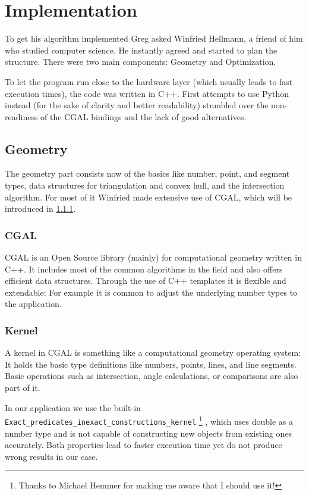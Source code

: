\chapter{Implementation}\label{cha:implementation}
To get his algorithm implemented Greg asked Winfried Hellmann, a
friend of him who studied computer science. He instantly agreed and
started to plan the structure. There were two main components:
Geometry and Optimization.

To let the program run close to the hardware layer (which usually
leads to fast execution times), the code was written in C++. First
attempts to use Python instead (for the sake of clarity and better
readability) stumbled over the non-readiness of the CGAL bindings and
the lack of good alternatives.

\section{Geometry}
The geometry part consists now of the basics like number, point, and
segment types, data structures for triangulation and convex hull, and
the intersection algorithm. For most of it Winfried made extensive use
of CGAL, which will be introduced in \cref{sec:CGAL}.

\subsection{CGAL}\label{sec:CGAL}
CGAL \cite{cgal} is an Open Source library (mainly) for computational
geometry written in C++. It includes most of the common algorithms in
the field and also offers efficient data structures. Through the use
of C++ templates it is flexible and extendable: For example it is
common to adjust the underlying number types to the application.

\subsection{Kernel}
A kernel in CGAL is something like a computational geometry operating
system: It holds the basic type definitions like numbers, points,
lines, and line segments. Basic operations such as intersection,
angle calculations, or comparisons are also part of it.

In our application we use the built-in 
\verb|Exact_predicates_inexact_constructions_kernel|%
\footnote{Thanks to Michael Hemmer for making me aware that I should
use it!} \cite{cgal_manual_epick}, which uses double as a number type
and is not capable of
constructing new objects from existing ones accurately. Both
properties lead to faster execution time yet do not produce wrong
results in our case.

